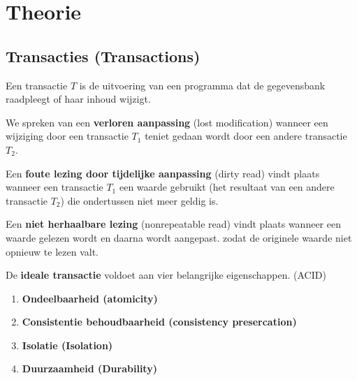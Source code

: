 \documentclass[transacties.tex]{subfiles}
\begin{document}
\chapter{Theorie}

\section{Transacties (Transactions)}
\begin{de}
Een transactie $T$ is de uitvoering van een programma dat de gegevensbank raadpleegt of haar inhoud wijzigt.
\end{de}

\begin{de}
We spreken van een \textbf{verloren aanpassing} (lost modification) wanneer een wijziging door een transactie $T_1$ teniet gedaan wordt door een andere transactie $T_2$.
\end{de}

\begin{de}
Een \textbf{foute lezing door tijdelijke aanpassing} (dirty read) vindt plaats wanneer een transactie $T_1$ een waarde gebruikt (het resultaat van een andere transactie $T_2$) die ondertussen niet meer geldig is.
\end{de}

\begin{de}
Een \textbf{niet herhaalbare lezing} (nonrepeatable read) vindt plaats wanneer een waarde gelezen wordt en daarna wordt aangepast. zodat de originele waarde niet opnieuw te lezen valt.
\end{de}

\begin{de}
De \textbf{ideale transactie} voldoet aan vier belangrijke eigenschappen. (ACID)
\begin{enumerate}
\item \textbf{Ondeelbaarheid (atomicity)}
\item \textbf{Consistentie behoudbaarheid (consistency presercation)}\\
\item \textbf{Isolatie (Isolation)}
\item \textbf{Duurzaamheid (Durability)}
\end{enumerate}
\end{de}
\end{document}
